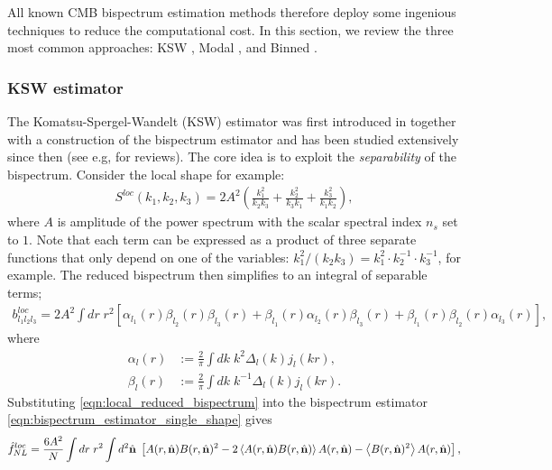 All known CMB bispectrum estimation methods therefore deploy some ingenious techniques to reduce the computational cost. In this section, we review the three most common approaches: KSW \cite{Komatsu2005,Creminelli2006limits}, Modal \cite{Fergusson2010general,Fergusson2012}, and Binned \cite{Bucher2010,Bucher2016}.

\subsubsection*{KSW estimator}
The Komatsu-Spergel-Wandelt (KSW) estimator was first introduced in \cite{Komatsu2005} together with a construction of the bispectrum estimator and has been studied extensively since then \cite{Creminelli2006limits,Babich2005optimal,Creminelli2007estimators} (see e.g, \cite{Komatsu2010} for reviews). The core idea is to exploit the \textit{separability} of the bispectrum. Consider the local shape for example:
\begin{align}
	S^{loc}(k_1, k_2, k_3) = 2A^2 \left( \frac{k_1^2}{k_2 k_3} + \frac{k_2^2}{k_3 k_1} +  \frac{k_3^2}{k_1 k_2} \right),
\end{align}
where $A$ is amplitude of the power spectrum with the scalar spectral index $n_s$ set to $1$. Note that each term can be expressed as a product of three separate functions that only depend on one of the variables: $k_1^2/(k_2 k_3) = k_1^2 \cdot k_2^{-1} \cdot k_3^{-1}$, for example. The reduced bispectrum then simplifies to an integral of separable terms;
\begin{align}
	b^{loc}_{l_1 l_2 l_3} = 2A^2 \int dr \; r^2 \left[ \alpha_{l_1}(r) \beta_{l_2}(r) \beta_{l_3}(r) + \beta_{l_1}(r) \alpha_{l_2}(r) \beta_{l_3}(r) + \beta_{l_1}(r) \beta_{l_2}(r) \alpha_{l_3}(r) \right], \label{eqn:local_reduced_bispectrum}
\end{align}
where
\begin{align}
	\alpha_l(r) &:= \frac{2}{\pi} \int dk \; k^2 \Delta_l(k) j_l(kr), \label{def:KSW_estimator_alpha}\\
	\beta_l(r) &:= \frac{2}{\pi} \int dk \; k^{-1} \Delta_l(k) j_l(kr). \label{def:KSW_estimator_beta}
\end{align}
Substituting \eqref{eqn:local_reduced_bispectrum} into the bispectrum estimator \eqref{eqn:bispectrum_estimator_single_shape} gives
\begin{align}
	\hat{f}^{loc}_{NL} = \frac{6A^2}{N} \int dr \; r^2 \int d^2 \hat{\mathbf{n}} \; \left[ A(r,\hat{\mathbf{n}}) B(r,\hat{\mathbf{n}})^2 - 2 \left <A(r,\hat{\mathbf{n}}) B(r,\hat{\mathbf{n}}) \right> A(r,\hat{\mathbf{n}}) - \left< B(r,\hat{\mathbf{n}})^2 \right> A(r,\hat{\mathbf{n}})  \right], \label{eqn:KSW_estimator_local}
\end{align}
